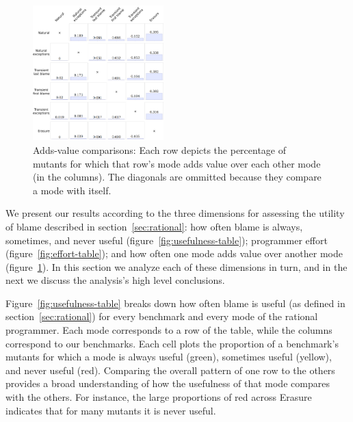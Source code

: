 \begin{figure}
  \centering
  \includegraphics[width=0.45\textwidth]{./plots/avo-matrix}
  \caption{Adds-value comparisons: Each row depicts the percentage of mutants for which that row's mode adds value over each other mode (in the columns). The diagonals are ommitted because they compare a mode with itself.}
  \label{fig:avo-matrix}
\end{figure}

We present our results according to the three dimensions for assessing the utility of blame described in section~\ref{sec:rational}: how often blame is always, sometimes, and never useful (figure~\ref{fig:usefulness-table}); programmer effort (figure~\ref{fig:effort-table}); and how often one mode adds value over another mode (figure~\ref{fig:avo-matrix}).
In this section we analyze each of these dimensions in turn, and in the next we discuss the analysis's high level conclusions.

Figure~\ref{fig:usefulness-table} breaks down how often blame is useful (as defined in section~\ref{sec:rational}) for every benchmark and every mode of the rational programmer.
Each mode corresponds to a row of the table, while the columns correspond to our benchmarks.
Each cell plots the proportion of a benchmark's mutants for which a mode is always useful (green), sometimes useful (yellow), and never useful (red).
Comparing the overall pattern of one row to the others provides a broad understanding of how the usefulness of that mode compares with the others.
For instance, the large proportions of red across Erasure indicates that for many mutants it is never useful.

